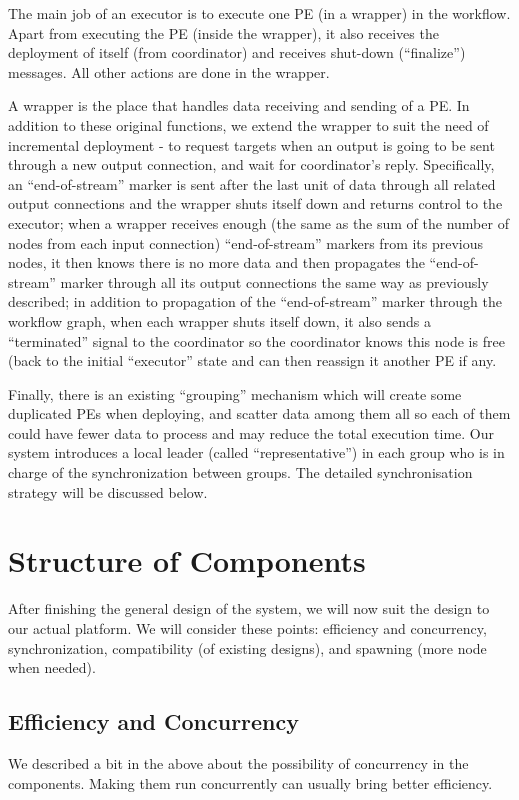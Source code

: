 The main job of an executor is to execute one PE (in a wrapper) in the workflow. Apart from executing the PE (inside the wrapper), it also receives the deployment of itself (from coordinator) and receives shut-down (``finalize'') messages. All other actions are done in the wrapper.

A wrapper is the place that handles data receiving and sending of a PE. In addition to these original functions, we extend the wrapper to suit the need of incremental deployment - to request targets when an output is going to be sent through a new output connection, and wait for coordinator's reply. Specifically, an ``end-of-stream'' marker is sent after the last unit of data through all related output connections and the wrapper shuts itself down and returns control to the executor; when a wrapper receives enough (\ie the same as the sum of the number of nodes from each input connection) ``end-of-stream'' markers from its previous nodes, it then knows there is no more data and then propagates the ``end-of-stream'' marker through all its output connections the same way as previously described; in addition to propagation of the ``end-of-stream'' marker through the workflow graph, when each wrapper shuts itself down, it also sends a ``terminated'' signal to the coordinator so the coordinator knows this node is free (\ie back to the initial ``executor'' state and can then reassign it another PE if any.

Finally, there is an existing ``grouping'' mechanism which will create some duplicated PEs when deploying, and scatter data among them all so each of them could have fewer data to process and may reduce the total execution time. Our system introduces a local leader (called ``representative'') in each group who is in charge of the synchronization between groups. The detailed synchronisation strategy will be discussed below.

\section{Structure of Components}
After finishing the general design of the system, we will now suit the design to our actual platform. We will consider these points: efficiency and concurrency, synchronization, compatibility (of existing designs), and spawning (more node when needed).

\subsection{Efficiency and Concurrency}
We described a bit in the above  about the possibility of concurrency in the components. Making them run concurrently can usually bring better efficiency.

